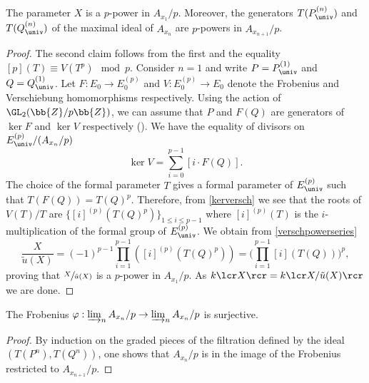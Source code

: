 \begin{prop}
\label{propSuperSingFrob}
The parameter $X$ is a $p$-power in $A_{x_1}/p$. Moreover, the generators $T(P^{(n)}_{\univ})$ and $T(Q^{(n)}_{\univ})$ of the maximal ideal of $A_{x_n}$ are $p$-powers in $A_{x_{n+1}}/p$.
\end{prop}

\begin{proof}
The second claim follows from the first and the equality $[p](T)\equiv V(T^p) \mod p$. Consider $n=1$ and write $P=P^{(1)}_{\univ}$ and $Q=Q^{(1)}_{\univ}$. Let $F: E_0\to E_0^{(p)}$ and $V: E_0^{(p)}\to E_0$ denote the Frobenius and Verschiebung homomorphisms respectively. Using the action of $\GL_2(\bb{Z}/p\bb{Z})$, we can assume that $P$ and $F(Q)$ are generators of $\ker F$ and $\ker V$ respectively (\cf \cite[Th.\,5.5.2]{katz1985arithmetic}). We have the equality of divisors on $E_{\univ}^{(p)}/(A_{x_n}/p)$
\begin{equation}
\label{kerversch}
\ker V= \sum_{i=0}^{p-1} [i\cdot F(Q)].
\end{equation}
The choice of the formal parameter $T$ gives a formal parameter of $E^{(p)}_{\univ}$ such that $T(F(Q))=T(Q)^p$. Therefore, from \eqref{kerversch} we see that the roots of $V(T)/T$ are $\{[i]^{(p)}(T(Q)^p)\}_{1\leq i\leq p-1}$ where $[i]^{(p)}(T)$ is the $i$-multiplication of the formal group of $E^{(p)}_{\univ}$. We obtain from \eqref{verschpowerseries}
\[
\frac{X}{\tilde{u}(X)}= (-1)^{p-1} \prod_{i=1}^{p-1} ([i]^{(p)}(T(Q)^p))= \biggl(\prod_{i=1}^{p-1}[i](T(Q))\biggr)^p,
\]
proving that $\sfrac{X}{\tilde{u}(X)}$ is a $p$-power in $A_{x_1}/p$. As $k\lcr X\rcr=k\lcr X/\tilde{u}(X)\rcr$ we are done.
\end{proof}

\begin{cor}
\label{corsupersingfrob}
The Frobenius $\varphi: \varinjlim_n A_{x_n}/p \to \varinjlim_n A_{x_n}/p$ is surjective.
\end{cor}

\begin{proof}
By induction on the graded pieces of the filtration defined by the ideal $(T(P^n),T(Q^n))$, one shows that $A_{x_n}/p$ is in the image of the Frobenius restricted to $A_{x_{n+1}}/p$.
\end{proof}

